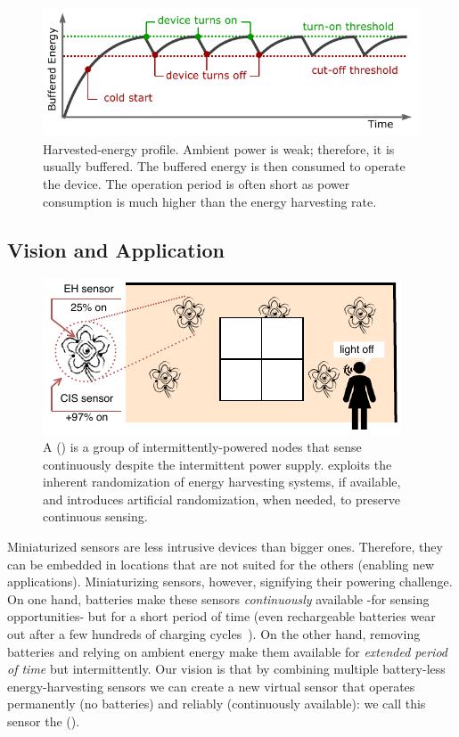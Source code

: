 \begin{figure}[b]
	\centering
		\includegraphics[width=\columnwidth]{figures/intermittent_operation}
		\caption{Harvested-energy profile. Ambient power is weak; therefore, it is usually buffered. The buffered energy is then consumed to operate the device. The operation period is often short as power consumption is much higher than the energy harvesting rate.}
		\label{fig:intermittent_opertaion}
\end{figure} 
%
\subsection{Vision and Application}
%
\begin{figure}[t]
	\centering
	\includegraphics[width=\columnwidth]{figures/smart_fabric}
	\caption{A \fullcis (\cis) is a group of intermittently-powered nodes that sense continuously despite the intermittent power supply. \cis exploits the inherent randomization of energy harvesting systems, if available, and introduces artificial randomization, when needed, to preserve continuous sensing.}
	\label{fig:smart_fabric}
\end{figure}
%
Miniaturized sensors are less intrusive devices than bigger ones. Therefore, they can be embedded in locations that are not suited for the others (enabling new applications). Miniaturizing sensors, however, signifying their powering challenge.
On one hand, batteries make these sensors \emph{continuously} available -for sensing opportunities- but for a short period of time (even rechargeable batteries wear out after a few hundreds of charging cycles~\cite{aditya2008comparison}). 
On the other hand, removing batteries and relying on ambient energy make them available for \emph{extended period of time} but intermittently. Our vision is that by combining multiple battery-less energy-harvesting sensors we can create a new virtual sensor that operates permanently (no batteries) and reliably (continuously available): we call this sensor the \emph{\fullcis} (\cis).

